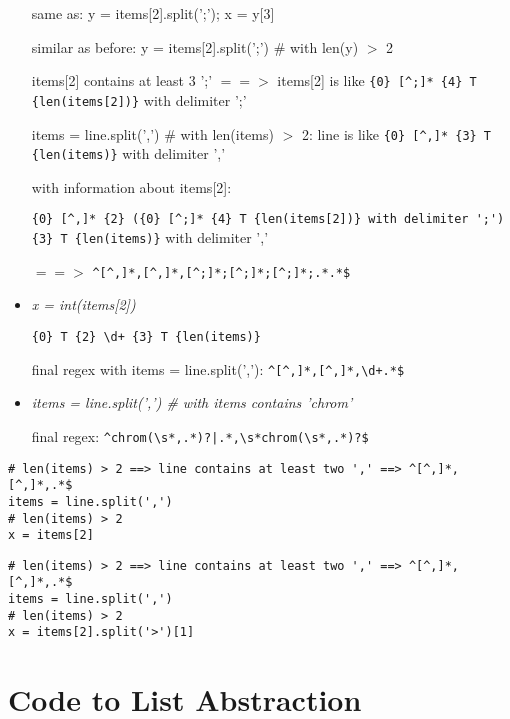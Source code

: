 \documentclass[11pt]{article}
\begin{document}
\begin{itemize}
same as: y = items[2].split(';'); x = y[3]

similar as before: y = items[2].split(';') \# with len(y) $>$ 2

items[2] contains at least 3 ';' $==>$ items[2] is like \verb|{0} [^;]* {4} T {len(items[2])}| with delimiter ';' 

items = line.split(',') \# with len(items) $>$ 2: line is like \verb|{0} [^,]* {3} T {len(items)}| with delimiter ','

with information about items[2]: 

\verb|{0} [^,]* {2} ({0} [^;]* {4} T {len(items[2])} with delimiter ';') {3} T {len(items)}| with delimiter ','

$==>$ \verb|^[^,]*,[^,]*,[^;]*;[^;]*;[^;]*;.*.*$|




\item \textit{x = int(items[2])}

\verb|{0} T {2} \d+ {3} T {len(items)}|

final regex with items = line.split(','): \verb|^[^,]*,[^,]*,\d+.*$|


\item \textit{items = line.split(',') \# with items contains 'chrom'}

final regex: \verb=^chrom(\s*,.*)?|.*,\s*chrom(\s*,.*)?$=

\end{itemize}

\begin{minipage}{\linewidth}
  \centering
\begin{lstlisting}[language=Python2, caption=Example from brca: convert\_tsv\_to\_vcf]
# len(items) > 2 ==> line contains at least two ',' ==> ^[^,]*,[^,]*,.*$
items = line.split(',')
# len(items) > 2
x = items[2]
\end{lstlisting}
\end{minipage}

\begin{minipage}{\linewidth}
  \centering
\begin{lstlisting}[language=Python2, caption=Example from brca: convert\_tsv\_to\_vcf]
# len(items) > 2 ==> line contains at least two ',' ==> ^[^,]*,[^,]*,.*$
items = line.split(',')
# len(items) > 2
x = items[2].split('>')[1]
\end{lstlisting}
\end{minipage}

\section{Code to List Abstraction}
\end{document}
